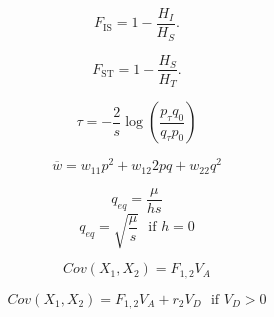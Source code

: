 \documentclass[12pt,twocolumn]{article}
\newcommand{\fis}{F_{\mathrm{IS}}}
\newcommand{\fst}{F_{\mathrm{ST}}}
\begin{document}
\begin{equation}
\fis =1-\frac{H_I}{H_S}.\nonumber
\end{equation}

\begin{equation}
\fst =1-\frac{H_S}{H_T}.\nonumber
\end{equation}

\begin{equation}
	\tau = -\frac{2}{s} \log \left(\frac{p_{\tau} q_0}{q_{\tau} p_0}\right)
\end{equation}

\begin{equation}
\overline{w} = w_{11}p^2+w_{12}2pq+w_{22}q^2
\end{equation}

\begin{equation}
q_{eq} = \frac{\mu}{hs}
\end{equation}
\begin{equation}
q_{eq} =\sqrt{\frac{\mu}{s}}~~~\textrm{if } h=0
\end{equation}

\begin{equation}
Cov(X_1,X_2)  = F_{1,2} V_A 
\end{equation}

\begin{equation}
Cov(X_1,X_2)  = F_{1,2} V_A + r_2 V_D~~~\textrm{if } V_D>0
\end{equation}
\end{document}
